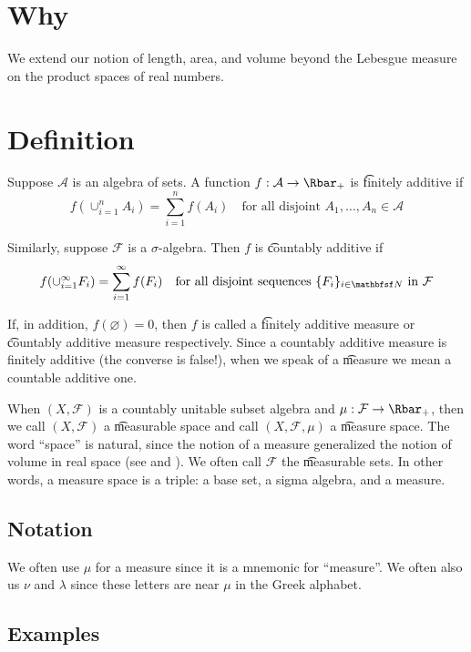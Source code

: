 
\section*{Why}

We extend our notion of length, area, and volume beyond the Lebesgue measure on the product spaces of real numbers.

\section*{Definition}

Suppose $\mathcal{A} $ is an algebra of sets.
A function $f: \mathcal{A}  \to \Rbar_+$ is \t{finitely additive} if
\[
f(\cup_{i = 1}^{n} A_i) = \sum_{i = 1}^{n} f(A_i) \quad \text{for all disjoint } A_1, \dots , A_n \in \mathcal{A}
\]

Similarly, suppose $\mathcal{F} $ is a $\sigma $-algebra.
Then $f$ is \t{countably additive} if
\[
f(\cup_{i = 1}^{\infty} F_i) = \sum_{i =1 }^{\infty} f(F_i) \quad \text{for all disjoint sequences } \set{F_i}_{i \in \N  } \text{ in } \mathcal{F}
\]

If, in addition, $f(\varnothing) = 0$, then $f$ is called a \t{finitely additive measure} or \t{countably additive measure} respectively.
Since a countably additive measure is finitely additive (the converse is false!), when we speak of a \t{measure} we mean a countable additive one.

When $(X, \mathcal{F} )$ is a countably unitable subset algebra and $\mu : \mathcal{F}  \to \Rbar_+$, then we call $(X, \mathcal{F} )$ a \t{measurable space} and call $(X, \mathcal{F} , \mu )$ a \t{measure space}.
The word ``space'' is natural, since the notion of a measure generalized the notion of volume in real space (see and ).
We often call $\mathcal{F} $ the \t{measurable sets}.
In other words, a measure space is a triple: a base set, a sigma algebra, and a measure.

\subsection*{Notation}

We often use $\mu $ for a measure since it is a mnemonic for ``measure''.
We often also us $\nu $ and $\lambda $ since these letters are near $\mu $ in the Greek alphabet.

\subsection*{Examples}

